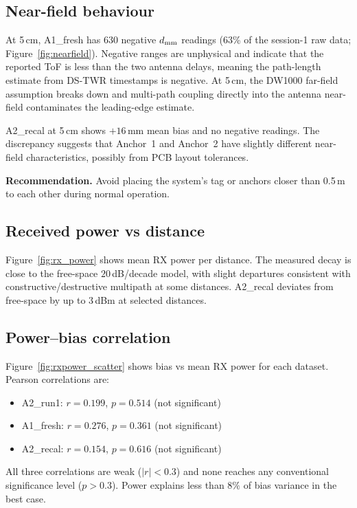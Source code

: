 \documentclass[10pt,a4paper,twocolumn]{article}
\begin{document}
\subsection{Near-field behaviour}

At 5\,cm, A1\_fresh has 630 negative $d_{\rm mm}$ readings
(63\% of the session-1 raw data; Figure~\ref{fig:nearfield}).  Negative ranges
are unphysical and indicate that the reported ToF is less than the two antenna
delays, meaning the path-length estimate from DS-TWR timestamps is negative.
At 5\,cm, the DW1000 far-field assumption breaks down and multi-path
coupling directly into the antenna near-field contaminates the leading-edge
estimate.

A2\_recal at 5\,cm shows $+16$\,mm mean bias and no negative readings.
The discrepancy suggests that Anchor~1 and Anchor~2 have slightly different
near-field characteristics, possibly from PCB layout tolerances.

\textbf{Recommendation.}  Avoid placing the system's tag or anchors closer
than 0.5\,m to each other during normal operation.

\subsection{Received power vs distance}

Figure~\ref{fig:rx_power} shows mean RX power per distance.  The measured
decay is close to the free-space $20$\,dB/decade model, with slight departures
consistent with constructive/destructive multipath at some distances.
A2\_recal deviates from free-space by up to 3\,dBm at selected
distances.

\subsection{Power--bias correlation}

Figure~\ref{fig:rxpower_scatter} shows bias vs mean RX power for each dataset.
Pearson correlations are:
\begin{itemize}[noitemsep]
\item A2\_run1: $r = 0.199$, $p = 0.514$ (not significant)
\item A1\_fresh: $r = 0.276$, $p = 0.361$ (not significant)
\item A2\_recal: $r = 0.154$, $p = 0.616$ (not significant)
\end{itemize}

All three correlations are weak ($|r| < 0.3$) and none reaches any
conventional significance level ($p > 0.3$).  Power explains less than
$8\%$ of bias variance in the best case.
\end{document}
